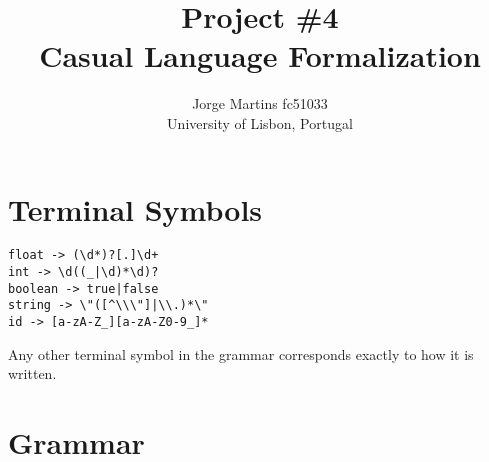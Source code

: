 \documentclass[11pt, a4paper]{article}
\author{Jorge Martins fc51033\\
University of Lisbon, Portugal}
\date{}
\title{Project \#4\\ Casual Language Formalization}
\begin{document}
\maketitle
\thispagestyle{empty}
\newpage
\section{Terminal Symbols}
\begin{lstlisting}
float -> (\d*)?[.]\d+
int -> \d((_|\d)*\d)?
boolean -> true|false
string -> \"([^\\\"]|\\.)*\"
id -> [a-zA-Z_][a-zA-Z0-9_]*
\end{lstlisting}
Any other terminal symbol in the grammar corresponds 
exactly to how it is written.
\section{Grammar}
\end{document}

